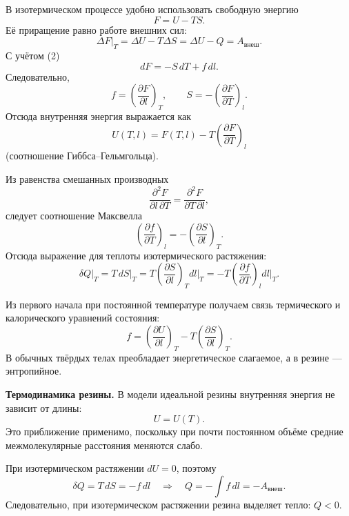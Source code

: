 \documentclass[12pt,a4paper]{article}
\numberwithin{equation}{section}
\begin{document}
В изотермическом процессе удобно использовать свободную энергию
\begin{equation}\tag{3}
    F = U - TS.
\end{equation}
Её приращение равно работе внешних сил:
\[
    \Delta F\big|_T = \Delta U - T\Delta S = \Delta U - Q = A_{\text{внеш}}.
\]
С учётом (2)
\begin{equation}\tag{4}
    dF = -S\,dT + f\,dl.
\end{equation}
Следовательно,
\begin{equation}\tag{5}
    f = \left(\frac{\partial F}{\partial l}\right)_T, \qquad
    S = -\left(\frac{\partial F}{\partial T}\right)_l.
\end{equation}
Отсюда внутренняя энергия выражается как
\begin{equation}\tag{6}
    U(T,l) = F(T,l) - T\left(\frac{\partial F}{\partial T}\right)_l
\end{equation}
(соотношение Гиббса--Гельмгольца).

Из равенства смешанных производных
\[
    \frac{\partial^2 F}{\partial l\,\partial T}
    =
    \frac{\partial^2 F}{\partial T\,\partial l},
\]
следует соотношение Максвелла
\begin{equation}\tag{7}
    \left(\frac{\partial f}{\partial T}\right)_l
    =
    -\left(\frac{\partial S}{\partial l}\right)_T.
\end{equation}
Отсюда выражение для теплоты изотермического растяжения:
\[
    \delta Q\big|_T = T\,dS\big|_T
    = T\left(\frac{\partial S}{\partial l}\right)_T dl\big|_T
    = -T\left(\frac{\partial f}{\partial T}\right)_l dl\big|_T.
\]

Из первого начала при постоянной температуре получаем связь термического и калорического уравнений состояния:
\begin{equation}\tag{8}
    f = \left(\frac{\partial U}{\partial l}\right)_T
    - T\left(\frac{\partial S}{\partial l}\right)_T.
\end{equation}
В обычных твёрдых телах преобладает энергетическое слагаемое, а в резине --- энтропийное.

\noindent\textbf{Термодинамика резины.} В модели идеальной резины внутренняя энергия не зависит от длины:
\begin{equation}\tag{9}
    U = U(T).
\end{equation}
Это приближение применимо, поскольку при почти постоянном объёме средние межмолекулярные расстояния меняются слабо.

При изотермическом растяжении $dU=0$, поэтому
\[
    \delta Q = T\,dS = - f\,dl
    \quad \Rightarrow \quad
    Q = -\int f\,dl = -A_{\text{внеш}}.
\]
Следовательно, при изотермическом растяжении резина выделяет тепло: $Q<0$.
\end{document}
